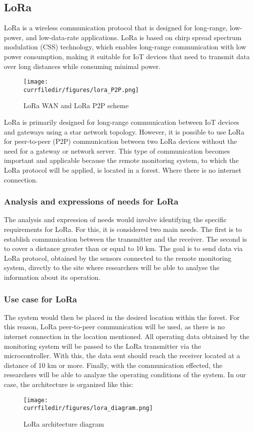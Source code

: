\newpage
\subsection{LoRa}
LoRa is a wireless communication protocol that is designed for long-range, low-power, and low-data-rate applications. LoRa is based on chirp spread spectrum modulation (CSS) technology, which enables long-range communication with low power consumption, making it suitable for IoT devices that need to transmit data over long distances while consuming minimal power.

\begin{figure}[!h]
    \centering
    \texttt{[image: \\currfiledir/figures/lora\_P2P.png]}
    \caption{LoRa WAN and LoRa P2P scheme}
\end{figure}

LoRa is primarily designed for long-range communication between IoT devices and gateways using a star network topology. However, it is possible to use LoRa for peer-to-peer (P2P) communication between two LoRa devices without the need for a gateway or network server.
This type of communication becomes important and applicable because the remote monitoring system, to which the LoRa protocol will be applied, is located in a forest. Where there is no internet connection.


\subsubsection{Analysis and expressions of needs for LoRa}
The analysis and expression of needs would involve identifying the specific requirements for LoRa. For this, it is considered two main needs. The first is to establish communication between the transmitter and the receiver. The second is to cover a distance greater than or equal to 10 km. The goal is to send data via LoRa protocol, obtained by the sensors connected to the remote monitoring system, directly to the site where researchers will be able to analyse the information about its operation.

\newpage
\subsubsection{Use case for LoRa}
The system would then be placed in the desired location within the forest. For this reason, LoRa peer-to-peer communication will be used, as there is no internet connection in the location mentioned. All operating data obtained by the monitoring system will be passed to the LoRa transmitter via the microcontroller. With this, the data sent should reach the receiver located at a distance of 10 km or more. Finally, with the communication effected, the researchers will be able to analyze the operating conditions of the system.  In our case, the architecture is organized like this:
\begin{figure}[!h]
    \centering
    \texttt{[image: \\currfiledir/figures/lora\_diagram.png]}
    \caption{LoRa architecture diagram}
\end{figure}

